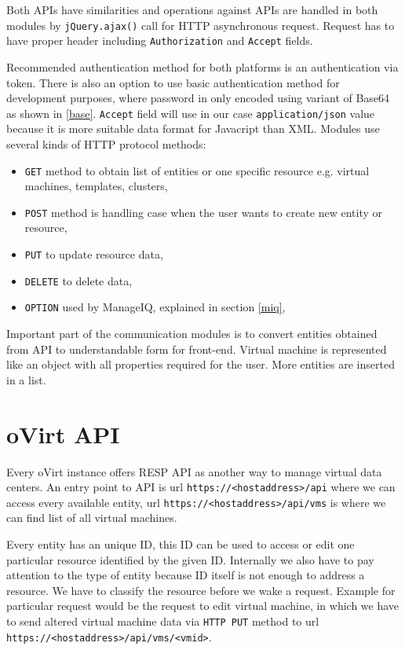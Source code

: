 Both APIs have similarities and operations against APIs are handled in both modules by \texttt{jQuery.ajax()}\cite{ajax} call for HTTP asynchronous request.
Request has to have proper header including \texttt{Authorization} and \texttt{Accept} fields. 

Recommended authentication method for both platforms is an authentication via token. There is also an option to use basic authentication method for development purposes, where password in only encoded using variant of Base64 as shown in \ref{base}.
\texttt{Accept} field will use in our case \texttt{application/json} value because it is more suitable data format for Javacript than XML. Modules use several kinds of HTTP protocol methods: 
\begin{itemize}
\item \texttt{GET} method to obtain list of entities or one specific resource e.g. virtual machines, templates, clusters,
\item \texttt{POST} method is handling case when the user wants to create new entity or resource,
\item \texttt{PUT} to update resource data,
\item \texttt{DELETE} to delete data,
\item \texttt{OPTION} used by ManageIQ, explained in section \ref{miq},
\end{itemize}

Important part of the communication modules is to convert entities obtained from API to understandable form for front-end. Virtual machine is represented like an object with all properties required for the user. More entities are inserted in a list.

\section{oVirt API}
Every oVirt instance offers RESP API as another way to manage virtual data centers. An entry point to API is url \texttt{https://<hostaddress>/api} where we can access every available entity, url \texttt{https://<hostaddress>/api/vms} is where we can find list of all virtual machines.

Every entity has an unique ID, this ID can be used to access or edit one particular resource identified by the given ID. Internally we also have to pay attention to the type of entity because ID itself is not enough to address a resource. We have to classify the resource before we wake a request. Example for particular request would be the request to edit virtual machine, in which we have to send altered virtual machine data via \texttt{HTTP PUT} method to url \texttt{https://<hostaddress>/api/vms/<vmid>}.

